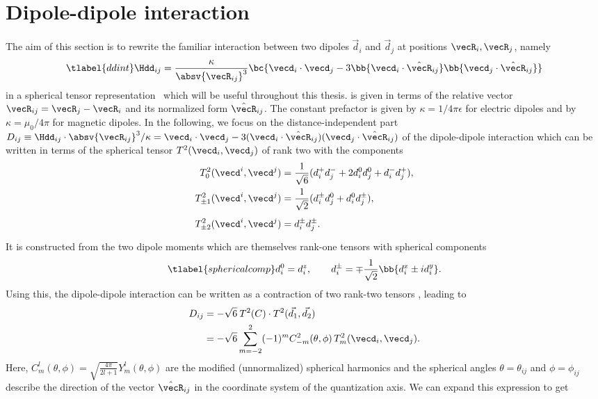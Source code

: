 \section{Dipole-dipole interaction}
The aim of this section is to rewrite the familiar interaction between two dipoles $\vec{d}_i$ and $\vec{d}_j$ at positions $\vecR_i, \vecR_j$, namely
\begin{align} \tlabel{ddint}
\Hdd_{ij} = \frac{\kappa}{\absv{\vecR_{ij}}^3} \bc{ \vecd_i \cdot \vecd_j -3 \bb{ \vecd_i \cdot \hat{\vecR}_{ij} }\bb{ \vecd_j \cdot \hat{\vecR}_{ij} } }
\end{align}
in a spherical tensor representation~\cite{Micheli2007,Gorshkov2011c} which will be useful throughout this thesis.
 is given in terms of the relative vector $\vecR_{ij} = \vecR_j - \vecR_i$ and its normalized form $\hat{\vecR}_{ij}$.
The constant prefactor is given by $\kappa = 1/4\pi\epsilon$ for electric dipoles and by
$\kappa = \mu_0 / 4\pi$ for magnetic dipoles.
In the following, we focus on the distance-independent part $D_{ij} \equiv \Hdd_{ij} \cdot \absv{\vecR_{ij}}^3/\kappa=\vecd_i \cdot \vecd_j -3 (\vecd_i \cdot \hat{\vecR}_{ij})(\vecd_j \cdot \hat{\vecR}_{ij})$ of the dipole-dipole interaction which can be written in terms of the spherical tensor $T^2(\vecd_i, \vecd_j)$ of rank two with the components
\begin{align}
T^2_0(\vecd^i, \vecd^j) &= \frac{1}{\sqrt{6}} (d_i^+ d_j^- + 2d_i^0 d_j^0 + d_i^{-} d_j^{+}), \\
T^2_{\pm 1}(\vecd^i, \vecd^j) &= \frac{1}{\sqrt{2}} (d_i^{\pm} d_j^0 + d_i^0 d_j^{\pm}), \\
T^2_{\pm 2}(\vecd^i, \vecd^j) &= d_i^{\pm} d_j^{\pm} \vphantom{\frac{1}{42}}.
\end{align}
It is constructed from the two dipole moments which are themselves rank-one tensors with spherical components
\begin{align} \tlabel{sphericalcomp}
d^0_i = d^z_i, \qquad d_i^\pm = \mp\frac{1}{\sqrt{2}}\bb{d_i^x\pm i d_i^y}.
\end{align}
Using this, the dipole-dipole interaction can be written as a contraction of two rank-two tensors \cite{Brown2003}, leading to
\begin{align}
    D_{ij} &= -\sqrt{6} \: T^2(C)\cdot T^2(\vec{d_1},\vec{d_2})\\
           &= -\sqrt{6}  \sum_{m=-2}^{2} (-1)^m C^2_{-m}(\theta,\phi) \, T^2_m(\vecd_i,\vecd_j).
\end{align}
Here, $C^l_m(\theta,\phi)=\sqrt{\frac{4\pi}{2l+1}} Y^l_m(\theta,\phi)$ are the modified (unnormalized) spherical harmonics and the spherical angles $\theta = \theta_{ij}$ and $\phi = \phi_{ij}$ describe the direction of the vector $\hat{\vecR}_{ij}$ in the coordinate system of the quantization axis. We can expand this expression to get
